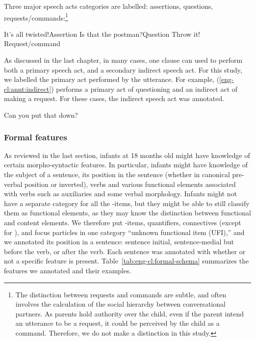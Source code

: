 Three major speech acts categories are labelled: assertions, questions, requests/commands:\footnote{The distinction between requests and commands are subtle, and often involves the calculation of the social hierarchy between conversational partners. As parents hold authority over the child, even if the parent intend an utterance to be a request, it could be perceived by the child as a command. Therefore, we do not make a distinction in this study.}

\bxl{} It’s all twisted!\hfill	Assertion
\ex Is that the postman?\hfill		Question
\ex Throw it!	\hfill		Request/command
\exl
\eex

As discussed in the last chapter, in many cases, one clause can used to perform both a primary speech act, and a secondary indirect speech act. For this study, we labelled the primary act performed by the utterance. For example, (\ref{eng-cl:annt:indirect}) performs a primary act of questioning and an indirect act of making a request. For these cases, the indirect speech act was annotated.

Can you put that down?
\eex 

\subsubsection{Formal features}

As reviewed in the last section, infants at 18 months old might have knowledge of certain morpho-syntactic features. In particular, infants might have knowledge of the subject of a sentence, its position in the sentence (whether in canonical pre-verbal position or inverted), verbs and various functional elements associated with verbs such as auxiliaries and some verbal morphology. Infants might not have a separate category for all the \twh-items, but they might be able to still classify them as functional elements, as they may know the distinction between functional and content elements. We therefore put \twh-items, quantifiers, connectives (except for ), and focus particles in one category ``unknown functional item (UFI),'' and we annotated its position in a sentence: sentence initial, sentence-medial but before the verb, or after the verb. Each sentence was annotated with whether or not a specific feature is present. Table~\ref{tab:eng-cl:formal-schema} summarizes the features we annotated and their examples.  


